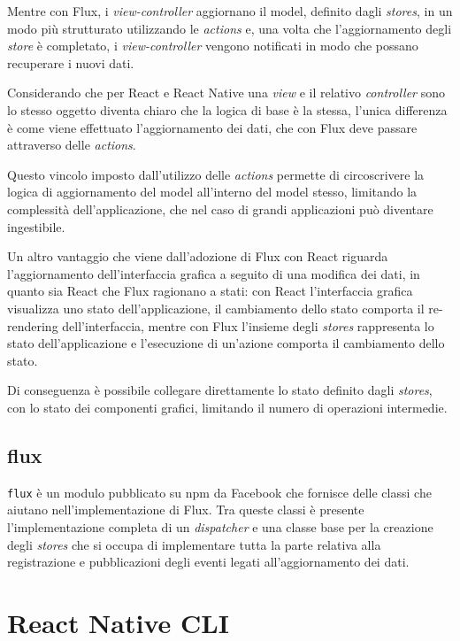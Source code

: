 Mentre con Flux, i \textit{view-controller} aggiornano il model, definito dagli \textit{stores}, in un modo più strutturato utilizzando le \textit{actions} e, una volta che l'aggiornamento degli \textit{store} è completato, i \textit{view-controller} vengono notificati in modo che possano recuperare i nuovi dati.

Considerando che per React e React Native una \textit{view} e il relativo \textit{controller} sono lo stesso oggetto diventa chiaro che la logica di base è la stessa, l'unica differenza è come viene effettuato l'aggiornamento dei dati, che con Flux deve passare attraverso delle \textit{actions}.

Questo vincolo imposto dall'utilizzo delle \textit{actions} permette di circoscrivere la logica di aggiornamento del model all'interno del model stesso, limitando la complessità dell'applicazione, che nel caso di grandi applicazioni può diventare ingestibile.

Un altro vantaggio che viene dall'adozione di Flux con React riguarda l'aggiornamento dell'interfaccia grafica a seguito di una modifica dei dati, in quanto sia React che Flux ragionano a stati: con React l'interfaccia grafica visualizza uno stato dell'applicazione, il cambiamento dello stato comporta il re-rendering dell'interfaccia, mentre con Flux l'insieme degli \textit{stores} rappresenta lo stato dell'applicazione e l'esecuzione di un'azione comporta il cambiamento dello stato.

Di conseguenza è possibile collegare direttamente lo stato definito dagli \textit{stores}, con lo stato dei componenti grafici, limitando il numero di operazioni intermedie.

\subsection{flux}\label{sec:flux-npm}

\texttt{flux} è un modulo pubblicato su npm da Facebook che fornisce delle classi che aiutano nell'implementazione di Flux.
Tra queste classi è presente l'implementazione completa di un \textit{dispatcher} e una classe base per la creazione degli \textit{stores} che si occupa di implementare tutta la parte relativa alla registrazione e pubblicazioni degli eventi legati all'aggiornamento dei dati.

\section{React Native CLI}\label{sec:packager}

